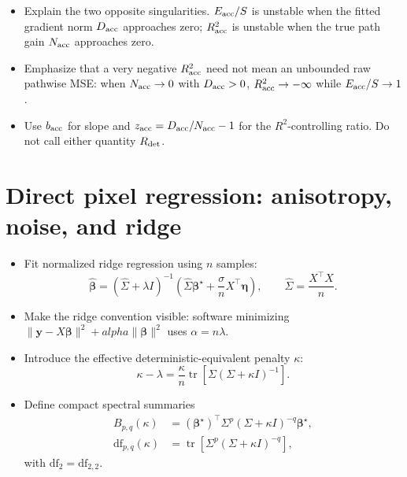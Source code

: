 \documentclass[11pt]{article}
\newcommand{\tr}{\operatorname{tr}}
\newcommand{\bhat}{\widehat{\bm\beta}}
\newcommand{\bstar}{\bm\beta^{\star}}
\begin{document}
\begin{itemize}
  \item Explain the two opposite singularities. $E_{\rm acc}/S$ is unstable
        when the fitted gradient norm $D_{\rm acc}$ approaches zero;
        $R_{\rm acc}^{2}$ is unstable when the true path gain
        $N_{\rm acc}$ approaches zero.
  \item Emphasize that a very negative $R_{\rm acc}^{2}$ need not mean an
        unbounded raw pathwise MSE: when $N_{\rm acc}\to0$ with
        $D_{\rm acc}>0$, $R_{\rm acc}^{2}\to-\infty$ while
        $E_{\rm acc}/S\to1$.
  \item Use $b_{\rm acc}$ for slope and
        $z_{\rm acc}=D_{\rm acc}/N_{\rm acc}-1$ for the $R^2$-controlling
        ratio. Do not call either quantity $R_{\rm det}$.
\end{itemize}

\section{Direct pixel regression: anisotropy, noise, and ridge}
\label{sec:pixel-ridge}

\begin{itemize}
  \item Fit normalized ridge regression using $n$ samples:
  \begin{equation}
    \bhat
    =(\widehat\Sigma+\lambda I)^{-1}
      \left(\widehat\Sigma\bstar+
      \frac{\sigma}{n}X^{\top}\bm\eta\right),
    \qquad \widehat\Sigma=\frac{X^{\top}X}{n}.
    \label{eq:pixel-ridge}
  \end{equation}
  \item Make the ridge convention visible: software minimizing
        $\lVert\bm y-X\bm\beta\rVert^2+alpha\lVert\bm\beta\rVert^2$
        uses $\alpha=n\lambda$.
  \item Introduce the effective deterministic-equivalent penalty $\kappa$:
  \begin{equation}
    \kappa-\lambda
      =\frac{\kappa}{n}\tr\!\left[
       \Sigma(\Sigma+\kappa I)^{-1}\right].
    \label{eq:kappa-fixed-point}
  \end{equation}
  \item Define compact spectral summaries
  \begin{align}
    B_{p,q}(\kappa)
      &=(\bstar)^{\top}\Sigma^p(\Sigma+\kappa I)^{-q}\bstar,\\
    \mathrm{df}_{p,q}(\kappa)
      &=\tr\!\left[\Sigma^p(\Sigma+\kappa I)^{-q}\right],
  \end{align}
  with $\mathrm{df}_{2}=\mathrm{df}_{2,2}$.
\end{itemize}
\end{document}
